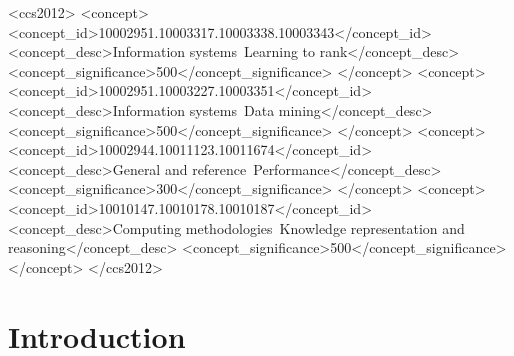 \documentclass[acmsmall,screen, review]{acmart}
\begin{document}
\begin{CCSXML}
	<ccs2012>
	<concept>
	<concept_id>10002951.10003317.10003338.10003343</concept_id>
	<concept_desc>Information systems~Learning to rank</concept_desc>
	<concept_significance>500</concept_significance>
	</concept>
	<concept>
	<concept_id>10002951.10003227.10003351</concept_id>
	<concept_desc>Information systems~Data mining</concept_desc>
	<concept_significance>500</concept_significance>
	</concept>
	<concept>
	<concept_id>10002944.10011123.10011674</concept_id>
	<concept_desc>General and reference~Performance</concept_desc>
	<concept_significance>300</concept_significance>
	</concept>
	<concept>
	<concept_id>10010147.10010178.10010187</concept_id>
	<concept_desc>Computing methodologies~Knowledge representation and reasoning</concept_desc>
	<concept_significance>500</concept_significance>
	</concept>
	</ccs2012>
\end{CCSXML}





\maketitle

\section{Introduction}
\label{sec3:int}

\end{document}
